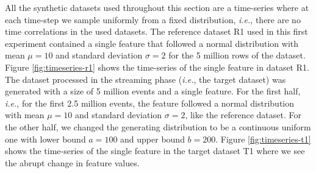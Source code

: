 All the synthetic datasets used throughout this section are a time-series where at each time-step we sample uniformly from a fixed distribution, \textit{i.e.}, there are no time correlations in the used datasets. The reference dataset R1 used in this first experiment contained a single feature that followed a normal distribution with mean $\mu=10$ and standard deviation $\sigma=2$ for the 5 million rows of the dataset. Figure \ref{fig:timeseries-r1} shows the time-series of the single feature in dataset R1. The dataset processed in the streaming phase (\textit{i.e.}, the target dataset) was generated with a size of 5 million events and a single feature. For the first half, \textit{i.e.}, for the first 2.5 million events, the feature followed a normal distribution with mean $\mu=10$ and standard deviation $\sigma=2$, like the reference dataset. For the other half, we changed the generating distribution to be a continuous uniform one with lower bound $a=100$ and upper bound $b=200$. Figure \ref{fig:timeseries-t1} shows the time-series of the single feature in the target dataset T1 where we see the abrupt change in feature values.
